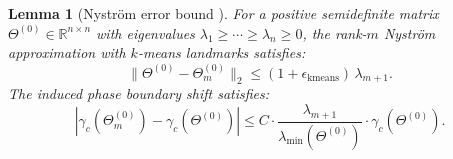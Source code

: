 \documentclass[11pt]{article}
\newtheorem{lemma}[theorem]{Lemma}
\theoremstyle{definition}
\newcommand{\R}{\mathbb{R}}
\newcommand{\norm}[1]{\lVert #1 \rVert}
\renewcommand{\Theta}{\varTheta}
\begin{document}
\begin{lemma}[Nystr\"om error bound {\citep{gittens2016revisiting}}]
\label{lem:nystrom-error}
For a positive semidefinite matrix $\Theta^{(0)} \in \R^{n \times n}$ with eigenvalues $\lambda_1 \ge \cdots \ge \lambda_n \ge 0$, the rank-$m$ Nystr\"om approximation with $k$-means landmarks satisfies:
\begin{equation}
\norm{\Theta^{(0)} - \Theta^{(0)}_m}_2 \le (1 + \epsilon_{\mathrm{kmeans}})\,\lambda_{m+1}.
\end{equation}
The induced phase boundary shift satisfies:
\begin{equation}
|\gamma_c(\Theta^{(0)}_m) - \gamma_c(\Theta^{(0)})| \le C \cdot \frac{\lambda_{m+1}}{\lambda_{\min}(\Theta^{(0)})} \cdot \gamma_c(\Theta^{(0)}).
\end{equation}
\end{lemma}

\end{document}

